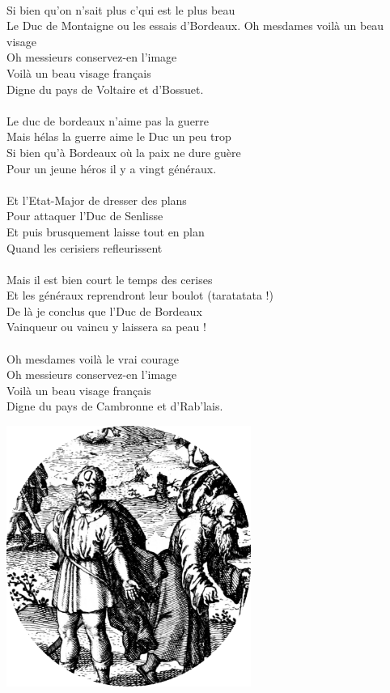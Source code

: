 \\Si bien qu'on n'sait plus c'qui est le plus beau
\\Le Duc de Montaigne ou les essais d'Bordeaux.
\breakpage
Oh mesdames voilà un beau visage
\\Oh messieurs conservez-en l'image
\\Voilà un beau visage français
\\Digne du pays de Voltaire et d'Bossuet.
\\\\Le duc de bordeaux n'aime pas la guerre
\\Mais hélas la guerre aime le Duc un peu trop
\\Si bien qu'à Bordeaux où la paix ne dure guère
\\Pour un jeune héros il y a vingt généraux.
\\\\Et l'Etat-Major de dresser des plans
\\Pour attaquer l'Duc de Senlisse
\\Et puis brusquement laisse tout en plan
\\Quand les cerisiers refleurissent
\\\\Mais il est bien court le temps des cerises
\\Et les généraux reprendront leur boulot (taratatata !)
\\De là je conclus que l'Duc de Bordeaux
\\Vainqueur ou vaincu y laissera sa peau !
\\\\Oh mesdames voilà le vrai courage
\\Oh messieurs conservez-en l'image
\\Voilà un beau visage français
\\Digne du pays de Cambronne et d'Rab'lais.
\bigskip
\begin{center}
\includegraphics[width=0.6\textwidth]{images/brev19.png}
\end{center}

\breakpage